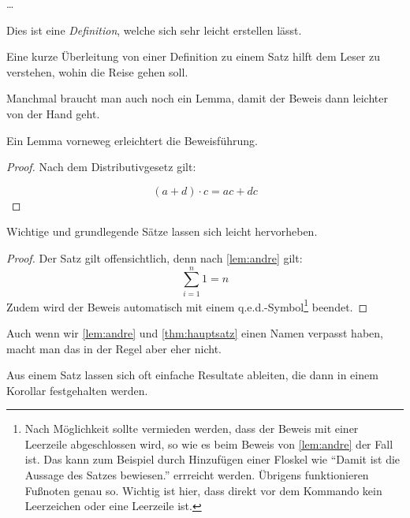 \documentclass[bachelor,german]{algothesis}
\begin{document}
\dots

\begin{definition}
  Dies ist eine \emph{Definition}, welche sich sehr leicht erstellen lässt.
\end{definition}

Eine kurze Überleitung von einer Definition zu einem Satz hilft dem
Leser zu verstehen, wohin die Reise gehen soll.

Manchmal braucht man auch noch ein Lemma, damit der Beweis dann leichter von der Hand geht.

\begin{lemma}[Andres Lemma] %
 Ein Lemma vorneweg erleichtert die Beweisführung.
 \label{lem:andre}
\end{lemma}
\begin{proof}
 Nach dem Distributivgesetz gilt:
 
 \[ (a+d) \cdot c = ac + dc \]
\end{proof}

\begin{theorem} \label{thm:hauptsatz}
  Wichtige und grundlegende Sätze lassen sich leicht hervorheben.
\end{theorem}
\begin{proof}
  Der Satz gilt offensichtlich, denn nach \cref{lem:andre} gilt:
  \begin{equation*}
    \sum_{i = 1}^{n} 1 = n
  \end{equation*}
  Zudem wird der Beweis automatisch mit einem q.e.d.-Symbol\footnote{Nach Möglichkeit sollte vermieden werden, dass der Beweis mit einer Leerzeile abgeschlossen wird, so wie es beim Beweis von \cref{lem:andre} der Fall ist. Das kann zum Beispiel durch Hinzufügen einer Floskel wie "`Damit ist die Aussage des Satzes bewiesen."' errreicht werden. Übrigens funktionieren Fußnoten genau so. Wichtig ist hier, dass direkt vor dem Kommando kein Leerzeichen oder eine Leerzeile ist.} beendet.
\end{proof}

Auch wenn wir \cref{lem:andre} und \cref{thm:hauptsatz} einen Namen verpasst haben, macht man das in der Regel aber eher nicht.

\begin{corollary}
 Aus einem Satz lassen sich oft einfache Resultate ableiten, die dann in einem Korollar festgehalten werden.
\end{corollary}
\end{document}
